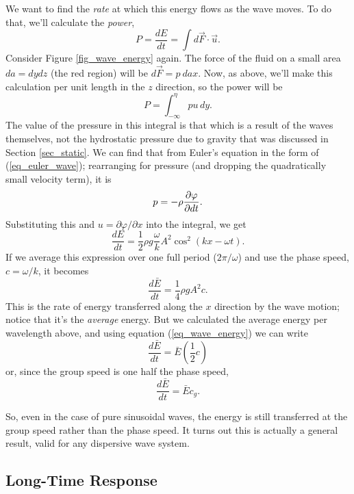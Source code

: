 We want to find the \emph{rate} at which this energy flows as the wave moves.  To do that, we'll calculate the \emph{power}, 
\[
P = \frac{dE}{dt} = \int d\vec{F} \cdot \vec{u}.
\]
Consider Figure \ref{fig_wave_energy} again.  The force of the fluid on a small area $da = dy dz$ (the red region) will be $d\vec{F} = p \ da \unit{x}$.  Now, as above, we'll make this calculation per unit length in the $z$ direction, so the power will be
\begin{equation}
P = \int_{-\infty}^\eta pu \, dy.
\end{equation}
The value of the pressure in this integral is that which is a result of the waves themselves, not the hydrostatic pressure due to gravity that was discussed in Section \ref{sec_static}.  We can find that from Euler's equation in the form of (\ref{eq_euler_wave}); rearranging for pressure (and dropping the quadratically small velocity term), it is
\begin{equation}
p = -\rho \frac{\partial {\varphi}}{\partial {dt}}.
\end{equation}
Substituting this and $u = \partial \varphi / \partial x$ into the integral, we get
\[
\frac{dE}{dt} = \frac{1}{2} \rho g \frac{\omega}{k} A^2 \cos^2(kx -\omega t).
\]
If we average this expression over one full period ($2\pi / \omega$) and use the phase speed, $c = \omega / k$, it becomes
\begin{equation}
\frac{d\bar{E}}{dt} = \frac{1}{4} \rho g A^2 c.
\end{equation}
This is the rate of energy transferred along the $x$ direction by the wave motion; notice that it's the \emph{average} energy.  But we calculated the average energy per wavelength above, and using equation (\ref{eq_wave_energy}) we can write
\[
\frac{d\bar{E}}{dt} = \bar{E} \left( \frac{1}{2} c \right)
\]
or, since the group speed is one half the phase speed,
\begin{equation}
\frac{d\bar{E}}{dt} = \bar{E} c_g.
\end{equation}

So, even in the case of pure sinusoidal waves, the energy is still transferred at the group speed rather than the phase speed.  It turns out this is actually a general result, valid for any dispersive  wave system.


\subsection{Long-Time Response}

